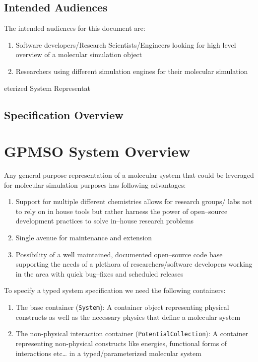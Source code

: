 \documentclass[12pt]{article}
\begin{document}
\subsection{Intended Audiences}
The intended audiences for this document are:

\begin{enumerate}
    \item Software developers/Research Scientists/Engineers looking for high level overview of a molecular simulation object
    \item Researchers using different simulation engines for their molecular simulation
\end{enumerate}
eterized System Representat
\subsection{Specification Overview}

\pagebreak
\section{GPMSO System Overview}
Any general purpose representation of a molecular system that could be leveraged for molecular simulation purposes has following advantages:
\begin{enumerate}
    \item Support for multiple different chemistries allows for research groups/ labs not to rely on in house tools but rather harness the power of open--source development practices to solve in--house research problems
    \item Single avenue for maintenance and extension
    \item Possibility of a well maintained, documented open--source code base supporting the needs of a plethora of researchers/software developers working in the area with quick bug--fixes and scheduled releases
\end{enumerate}

\noindent To specify a typed system specification we need the following containers:

\begin{enumerate}
    \item The base container (\texttt{System}): A container object representing physical constructs as well as the necessary physics that define a molecular system

    \item The non-physical interaction container (\texttt{PotentialCollection}): A container representing non-physical constructs like energies, functional forms of interactions etc… in a typed/parameterized molecular system
\end{enumerate}
\end{document}
